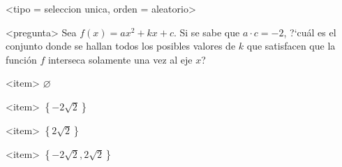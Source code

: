 <tipo = seleccion unica, orden = aleatorio>

<pregunta>
Sea $f(x)=ax^2+kx+c$. Si se sabe que $a\cdot c=-2$, ?`cu\'al es el conjunto donde se hallan todos los posibles valores de $k$ que satisfacen que la funci\'on $f$ interseca solamente una vez al eje $x$?


<item>
$\varnothing$

<item>
$\left\{-2\sqrt{2}\right\}$

<item>
$\left\{2\sqrt{2}\right\}$

<item>
$\left\{-2\sqrt{2},2\sqrt{2}\right\}$



